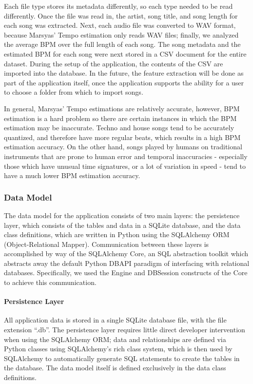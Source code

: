 \documentclass{article}
\begin{document}
Each file type stores its metadata differently, so each type needed to be read differently. Once the file was read in, the artist, song title, and song length for each song was extracted. Next, each audio file was converted to WAV format, because Marsyas' Tempo estimation only reads WAV files; finally, we analyzed the average BPM over the full length of each song. The song metadata and the estimated BPM for each song were next stored in a CSV document for the entire dataset. During the setup of the application, the contents of the CSV are imported into the database. In the future, the feature extraction will be done as part of the application itself, once the application supports the ability for a user to choose a folder from which to import songs.
 
In general, Marsyas' Tempo estimations are relatively accurate, however, BPM estimation is a hard problem so there are certain instances in which the BPM estimation may be inaccurate. Techno and house songs tend to be accurately quantized, and therefore have more regular beats, which results in a high BPM estimation accuracy. On the other hand, songs played by humans on traditional instruments that are prone to human error and temporal inaccuracies - especially those which have unusual time signatures, or a lot of variation in speed - tend to have a much lower BPM estimation accuracy. 

\subsubsection{Data Model}

The data model for the application consists of two main layers: the persistence layer, which consists of the tables and data in a SQLite database, and the data class definitions, which are written in Python using the SQLAlchemy ORM (Object-Relational Mapper). Communication between these layers is accomplished by way of the SQLAlc\-hemy Core, an SQL abstraction toolkit which abstracts away the default Python DBAPI paradigm of interfacing with relational databases. Specifically, we used the Engine and DBSession constructs of the Core to achieve this communication.

\paragraph{Persistence Layer}

All application data is stored in a single SQLite database file, with the file extension ``.db''. The persistence layer requires little direct developer intervention when using the SQLAlchemy ORM; data and relationships are defined via Python classes using SQLAlchemy's rich class system, wh\-ich is then used by SQLAlchemy to automatically generate SQL statements to create the tables in the database. The data model itself is defined exclusively in the data class definitions.
\end{document}

